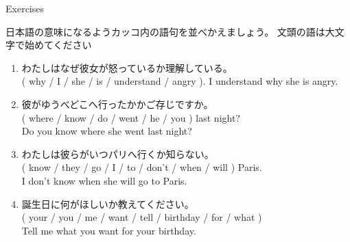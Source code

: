 \documentclass[aspectratio=169,xcolor={dvipsnames,table}]{beamer}
\begin{document}
\begin{frame}[plain]{Exercises}

{\small 日本語の意味になるようカッコ内の語句を並べかえましょう。
文頭の語は大文字で始めてください}%
\mbox{}\hfill{\scriptsize {}}

 \begin{enumerate}
  \item わたしはなぜ彼女が怒っているか理解している。\\( why / I / she / is / understand / angry ). %
\hfill{}I understand why she is angry.
  \item 彼がゆうべどこへ行ったかかご存じですか。\\( where / know / do / went / he / you ) last night? \\
Do you know where she went last night?
  \item わたしは彼らがいつパリへ行くか知らない。\\
( know / they / go / I / to / don't / when / will ) Paris. \\
I don't know when she will go to Paris.
  \item 誕生日に何がほしいか教えてください。\\
( your / you / me / want / tell / birthday / for / what ) \\
Tell me what you want for your birthday.

 \end{enumerate}
\end{frame}
\end{document}
